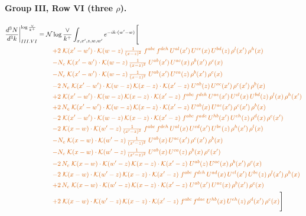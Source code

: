 \documentclass[10pt]{article}
\numberwithin{equation}{section}
\newcommand{\NNv}{\mathcal N\log\frac{\vee}{k^+}}
\begin{document}
\paragraph{Group III, Row VI (three $\rho$).}
\begin{align}
\frac{d^3N}{d^3k}\bigg|^{\log\frac{\vee}{k^+}}_{III.VI}={}&\NNv\int_{x,x',z,w,w'}e^{-ik\cdot(w'-w)}\Bigg[\notag\\
&\quad{\color{BFK}+2\;\mathcal{K}(x'-w')\cdot\mathcal{K}(w-z)\,\tfrac{1}{(x-z)^{2}}\;f^{abc}\,f^{deh}\,U^{al}(x')\,U^{ce}(x)\,U^{bd}(z)\,\rho^{l}(x')\,\rho^{h}(x)}\notag\\
&\quad{\color{BFK}-N_c\;\mathcal{K}(x'-w')\cdot\mathcal{K}(w-z)\,\tfrac{1}{(x-z)^{2}}\;U^{ab}(x')\,U^{ac}(x)\,\rho^{b}(x')\,\rho^{c}(x)}\notag\\
&\quad{\color{BFK}-N_c\;\mathcal{K}(x'-w')\cdot\mathcal{K}(w-z)\,\tfrac{1}{(x-z)^{2}}\;U^{ab}(x')\,U^{ca}(z)\,\rho^{b}(x')\,\rho^{c}(x)}\notag\\
&\quad{\color{BFK}-2\,N_c\;\mathcal{K}(x'-w')\cdot\mathcal{K}(w-z)\,\mathcal{K}(x-z)\cdot\mathcal{K}(x'-z)\;U^{ab}(z)\,U^{ac}(x')\,\rho^{c}(x')\,\rho^{b}(x)}\notag\\
&\quad{\color{BFK}+2\;\mathcal{K}(x'-w')\cdot\mathcal{K}(w-z)\,\mathcal{K}(x-z)\cdot\mathcal{K}(x'-z)\;f^{abc}\,f^{deh}\,U^{ae}(x')\,U^{cl}(x)\,U^{bd}(z)\,\rho^{l}(x)\,\rho^{h}(x')}\notag\\
&\quad{\color{BFK}+2\,N_c\;\mathcal{K}(x'-w')\cdot\mathcal{K}(w-z)\,\mathcal{K}(x-z)\cdot\mathcal{K}(x'-z)\;U^{ab}(x)\,U^{ac}(x')\,\rho^{c}(x')\,\rho^{b}(x)}\notag\\
&\quad{\color{BFK}-2\;\mathcal{K}(x'-w')\cdot\mathcal{K}(w-z)\,\mathcal{K}(x-z)\cdot\mathcal{K}(x'-z)\;f^{abc}\,f^{ade}\,U^{hb}(x')\,U^{eh}(z)\,\rho^{d}(x)\,\rho^{c}(x')}\notag\\
&\quad{\color{BFK}-2\;\mathcal{K}(x-w)\cdot\mathcal{K}(w'-z)\,\tfrac{1}{(x'-z)^{2}}\;f^{abc}\,f^{deh}\,U^{al}(x)\,U^{cd}(x')\,U^{be}(z)\,\rho^{h}(x')\,\rho^{l}(x)}\notag\\
&\quad{\color{BFK}-N_c\;\mathcal{K}(x-w)\cdot\mathcal{K}(w'-z)\,\tfrac{1}{(x'-z)^{2}}\;U^{ab}(x)\,U^{ac}(x')\,\rho^{c}(x')\,\rho^{b}(x)}\notag\\
&\quad{\color{BFK}-N_c\;\mathcal{K}(x-w)\cdot\mathcal{K}(w'-z)\,\tfrac{1}{(x'-z)^{2}}\;U^{ab}(x)\,U^{ca}(z)\,\rho^{b}(x)\,\rho^{c}(x')}\notag\\
&\quad{\color{BFK}-2\,N_c\;\mathcal{K}(x-w)\cdot\mathcal{K}(w'-z)\,\mathcal{K}(x-z)\cdot\mathcal{K}(x'-z)\;U^{ab}(z)\,U^{ac}(x)\,\rho^{b}(x')\,\rho^{c}(x)}\notag\\
&\quad{\color{BFK}-2\;\mathcal{K}(x-w)\cdot\mathcal{K}(w'-z)\,\mathcal{K}(x-z)\cdot\mathcal{K}(x'-z)\;f^{abc}\,f^{deh}\,U^{ad}(x)\,U^{cl}(x')\,U^{be}(z)\,\rho^{l}(x')\,\rho^{h}(x)}\notag\\
&\quad{\color{BFK}+2\,N_c\;\mathcal{K}(x-w)\cdot\mathcal{K}(w'-z)\,\mathcal{K}(x-z)\cdot\mathcal{K}(x'-z)\;U^{ab}(x')\,U^{ac}(x)\,\rho^{b}(x')\,\rho^{c}(x)}\notag\\
&\quad{\color{BFK}+2\;\mathcal{K}(x-w)\cdot\mathcal{K}(w'-z)\,\mathcal{K}(x-z)\cdot\mathcal{K}(x'-z)\;f^{abc}\,f^{dae}\,U^{hb}(x)\,U^{eh}(z)\,\rho^{d}(x')\,\rho^{c}(x)}\Bigg]\label{eq:P8}
\end{align}
\end{document}
